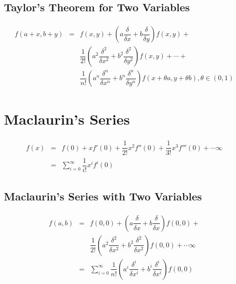 \documentclass[openany, oneside]{book}
\begin{document}
\subsection{Taylor's Theorem for Two Variables}
\begin{equation}
\begin{aligned}
\begin{split}
f(a+x,b+y)& = &f(x,y)+\left( a\dfrac{\delta}{\delta x}+b\dfrac{\delta}{\delta y}\right)f (x,y)+&\\
 & &\dfrac{1}{2!}\left( a^2\dfrac{\delta^2}{\delta x^2}+b^2\dfrac{\delta^2}{\delta y^2}\right) f(x,y)+\cdots+&\\
 & &\dfrac{1}{n!}\left( a^n\dfrac{\delta^n}{\delta x^n}+b^n\dfrac{\delta^n}{\delta y^n}\right) f(x+\theta a,y+\theta b), \theta \in (0,1) 
\end{split}
\end{aligned}
\end{equation}

\section{Maclaurin's Series}
\begin{equation}
\begin{aligned}
\begin{split}
f(x)&=&f(0)+xf'(0)+\dfrac{1}{2!}x^2f''(0)+\dfrac{1}{3!}x^3f'''(0)+\cdots\infty&\\
 &=& \sum_{i=0}^\infty \dfrac{1}{i!} x^i f^i(0)
\end{split}
\end{aligned}
\end{equation}

\subsection{Maclaurin's Series with Two Variables}
\begin{equation}
\begin{aligned}
\begin{split}
f(a,b)&=&f(0,0)+\left(a\dfrac{\delta}{\delta x}+b\dfrac{\delta}{\delta x}\right)f(0,0)+&\\& &\dfrac{1}{2!}\left(a^2\dfrac{\delta^2}{\delta x^2}+b^2\dfrac{\delta^2}{\delta x^2}\right)f(0,0)+\cdots\infty&\\
 & = & \sum_{i=0}^\infty \dfrac{1}{n!}\left(a^i\dfrac{\delta^i}{\delta x^i}+b^i\dfrac{\delta^i}{\delta x^i}\right)f(0,0)
\end{split}
\end{aligned}
\end{equation}
\end{document}
